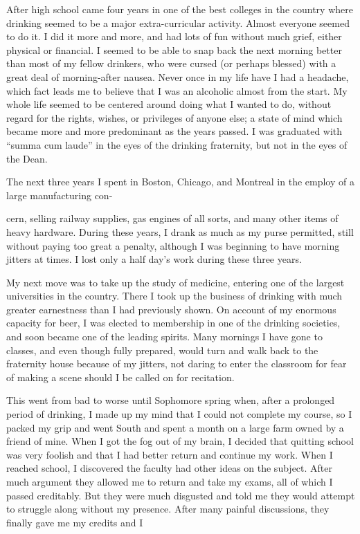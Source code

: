 \begin{biblechapter}
After high school came four years in one of the best colleges in the country where drinking seemed to be a major extra-curricular activity. Almost everyone seemed to do it. I did it more and more, and had lots of fun without much grief, either physical or financial. I seemed to be able to snap back the next morning better than most of my fellow drinkers, who were cursed (or perhaps blessed) with a great deal of morning-after nausea. Never once in my life have I had a headache, which fact leads me to believe that I was an alcoholic almost from the start. My whole life seemed to be centered around doing what I wanted to do, without regard for the rights, wishes, or privileges of anyone else; a state of mind which became more and more predominant as the years passed. I was graduated with “summa cum laude” in the eyes of the drinking fraternity, but not in the eyes of the Dean.

The next three years I spent in Boston, Chicago, and Montreal in the employ of a large manufacturing con-

cern, selling railway supplies, gas engines of all sorts, and many other items of heavy hardware. During these years, I drank as much as my purse permitted, still without paying too great a penalty, although I was beginning to have morning jitters at times. I lost only a half day’s work during these three years.

My next move was to take up the study of medicine, entering one of the largest universities in the country. There I took up the business of drinking with much greater earnestness than I had previously shown. On account of my enormous capacity for beer, I was elected to membership in one of the drinking societies, and soon became one of the leading spirits. Many mornings I have gone to classes, and even though fully prepared, would turn and walk back to the fraternity house because of my jitters, not daring to enter the classroom for fear of making a scene should I be called on for recitation.

This went from bad to worse until Sophomore spring when, after a prolonged period of drinking, I made up my mind that I could not complete my course, so I packed my grip and went South and spent a month on a large farm owned by a friend of mine. When I got the fog out of my brain, I decided that quitting school was very foolish and that I had better return and continue my work. When I reached school, I discovered the faculty had other ideas on the subject. After much argument they allowed me to return and take my exams, all of which I passed creditably. But they were much disgusted and told me they would attempt to struggle along without my presence. After many painful discussions, they finally gave me my credits and I


\end{biblechapter}
